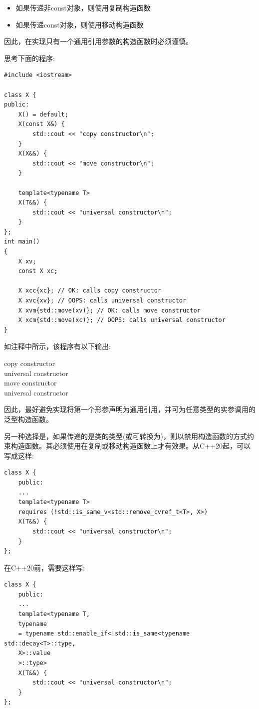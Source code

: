 \begin{itemize}
	\item 如果传递非const对象，则使用复制构造函数
	\item 如果传递const对象，则使用移动构造函数
\end{itemize}

因此，在实现只有一个通用引用参数的构造函数时必须谨慎。\par

思考下面的程序:\par

{\color{red}{generic/universalconstructor.cpp}}\par

\begin{lstlisting}[caption={}]
#include <iostream>

class X {
public:
	X() = default;
	X(const X&) {
		std::cout << "copy constructor\n";
	}
	X(X&&) {
		std::cout << "move constructor\n";
	}

	template<typename T>
	X(T&&) {
		std::cout << "universal constructor\n";
	}
};
int main()
{
	X xv;
	const X xc;
	
	X xcc{xc}; // OK: calls copy constructor
	X xvc{xv}; // OOPS: calls universal constructor
	X xvm{std::move(xv)}; // OK: calls move constructor
	X xcm{std::move(xc)}; // OOPS: calls universal constructor
}
\end{lstlisting}

如注释中所示，该程序有以下输出:\par

\begin{tcolorbox}[colback=white,colframe=black]
copy constructor \\
universal constructor \\
move constructor \\
universal constructor
\end{tcolorbox}

因此，最好避免实现将第一个形参声明为通用引用，并可为任意类型的实参调用的泛型构造函数。\par

另一种选择是，如果传递的是类的类型(或可转换为)，则以禁用构造函数的方式约束构造函数。其必须使用在复制或移动构造函数上才有效果。从C++20起，可以写成这样:\par

\begin{lstlisting}[caption={}]
class X {
	public:
	...
	template<typename T>
	requires (!std::is_same_v<std::remove_cvref_t<T>, X>)
	X(T&&) {
		std::cout << "universal constructor\n";
	}
};
\end{lstlisting}

在C++20前，需要这样写:\par

\begin{lstlisting}[caption={}]
class X {
	public:
	...
	template<typename T,
	typename
	= typename std::enable_if<!std::is_same<typename std::decay<T>::type,
	X>::value
	>::type>
	X(T&&) {
		std::cout << "universal constructor\n";
	}
};
\end{lstlisting}


















